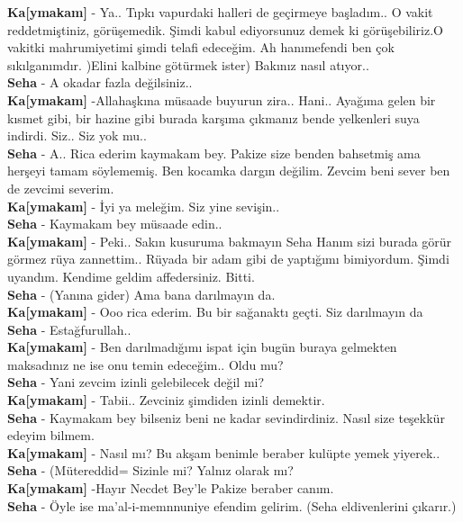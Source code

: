 \documentclass[]{book}
\begin{document}
\textbf{Ka{[}ymakam{]}} - Ya.. Tıpkı vapurdaki halleri de geçirmeye başladım.. O vakit reddetmiştiniz, görüşemedik. Şimdi kabul ediyorsunuz demek ki görüşebiliriz.O vakitki mahrumiyetimi şimdi telafi edeceğim. Ah hanımefendi ben çok sıkılganımdır. )Elini kalbine götürmek ister) Bakınız nasıl atıyor..\\
\textbf{Seha} - A okadar fazla değilsiniz..\\
\textbf{Ka{[}ymakam{]}} -Allahaşkına müsaade buyurun zira.. Hani.. Ayağıma gelen bir kısmet gibi, bir hazine gibi burada karşıma çıkmanız bende yelkenleri suya indirdi. Siz.. Siz yok mu..\\
\textbf{Seha} - A.. Rica ederim kaymakam bey. Pakize size benden bahsetmiş ama herşeyi tamam söylememiş. Ben kocamka dargın değilim. Zevcim beni sever ben de zevcimi severim.\\
\textbf{Ka{[}ymakam{]}} - İyi ya meleğim. Siz yine sevişin..\\
\textbf{Seha} - Kaymakam bey müsaade edin..\\
\textbf{Ka{[}ymakam{]}} - Peki.. Sakın kusuruma bakmayın Seha Hanım sizi burada görür görmez rüya zannettim.. Rüyada bir adam gibi de yaptığımı bimiyordum. Şimdi uyandım. Kendime geldim affedersiniz. Bitti.\\
\textbf{Seha} - (Yanına gider) Ama bana darılmayın da.\\
\textbf{Ka{[}ymakam{]}} - Ooo rica ederim. Bu bir sağanaktı geçti. Siz darılmayın da\\
\textbf{Seha} - Estağfurullah..\\
\textbf{Ka{[}ymakam{]}} - Ben darılmadığımı ispat için bugün buraya gelmekten maksadınız ne ise onu temin edeceğim.. Oldu mu?\\
\textbf{Seha} - Yani zevcim izinli gelebilecek değil mi?\\
\textbf{Ka{[}ymakam{]}} - Tabii.. Zevciniz şimdiden izinli demektir.\\
\textbf{Seha} - Kaymakam bey bilseniz beni ne kadar sevindirdiniz. Nasıl size teşekkür edeyim bilmem.\\
\textbf{Ka{[}ymakam{]}} - Nasıl mı? Bu akşam benimle beraber kulüpte yemek yiyerek..\\
\textbf{Seha} - (Mütereddid= Sizinle mi? Yalnız olarak mı?\\
\textbf{Ka{[}ymakam{]}} -Hayır Necdet Bey'le Pakize beraber canım.\\
\textbf{Seha} - Öyle ise ma'al-i-memnnuniye efendim gelirim. (Seha eldivenlerini çıkarır.)\\
\end{document}
